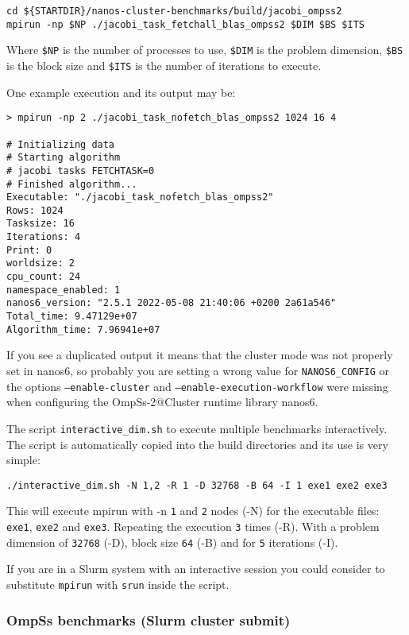 \documentclass{article}
\newcommand{\code}[1]{\texttt{#1}}
\begin{document}
\begin{lstlisting}
cd ${STARTDIR}/nanos-cluster-benchmarks/build/jacobi_ompss2
mpirun -np $NP ./jacobi_task_fetchall_blas_ompss2 $DIM $BS $ITS
\end{lstlisting}

Where \code{\$NP} is the number of processes to use, \code{\$DIM} is the
problem dimension, \code{\$BS} is the block size and \code{\$ITS} is the
number of iterations to execute.

One example execution and its output may be:
\begin{lstlisting}
> mpirun -np 2 ./jacobi_task_nofetch_blas_ompss2 1024 16 4

# Initializing data
# Starting algorithm
# jacobi tasks FETCHTASK=0
# Finished algorithm...
Executable: "./jacobi_task_nofetch_blas_ompss2"
Rows: 1024
Tasksize: 16
Iterations: 4
Print: 0
worldsize: 2
cpu_count: 24
namespace_enabled: 1
nanos6_version: "2.5.1 2022-05-08 21:40:06 +0200 2a61a546"
Total_time: 9.47129e+07
Algorithm_time: 7.96941e+07
\end{lstlisting}

If you see a duplicated output it means that the cluster mode was not
properly set in nanos6, so probably you are setting a wrong value for
\code{NANOS6\_CONFIG} or the options \code{--enable-cluster} and
\code{--enable-execution-workflow} were missing when configuring the
OmpSs-2@Cluster runtime library nanos6.

The script \code{interactive\_dim.sh} to execute multiple benchmarks
interactively. The script is automatically copied into the build
directories and its use is very simple:

\begin{lstlisting}
./interactive_dim.sh -N 1,2 -R 1 -D 32768 -B 64 -I 1 exe1 exe2 exe3
\end{lstlisting}

This will execute mpirun with -n \code{1} and \code{2} nodes (-N) for
the executable files: \code{exe1}, \code{exe2} and
\code{exe3}. Repeating the execution \code{3} times (-R). With a
problem dimension of \code{32768} (-D), block size \code{64} (-B) and
for \code{5} iterations (-I).

If you are in a Slurm system with an interactive session you could
consider to substitute \code{mpirun} with \code{srun} inside the
script.

\subsubsection{OmpSs benchmarks (Slurm cluster submit)}\label{SUBMIT}
\end{document}
